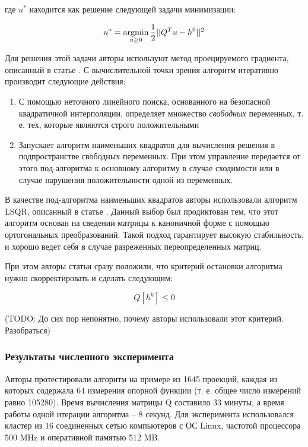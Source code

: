 \documentclass[a4paper, 12pt, titlepage]{article}
\theoremstyle{definition}
\theoremstyle{plain}
\theoremstyle{plain}
\begin{document}
где $u^{*}$ находится как решение следующей задачи минимизации:

\begin{equation}
 u^{*} = \operatornamewithlimits{argmin}_{u \geq 0}
 \frac{1}{2} ||Q^{T} u - h^{0}||^{2}
\end{equation}

Для решения этой задачи авторы используют метод проецируемого градиента,
описанный в статье \cite{journals/laa/BierlaireTT1995}. С вычислительной точки
зрения алгоритм итеративно производит следующие действия:

\begin{enumerate}
 \item С помощью неточного линейного поиска, основанного на безопасной
 квадратичной интерполяции, определяет множество \textit{свободных} переменных,
 т. е. тех, которые являются строго положительными
 \item Запускает алгоритм наименьших квадратов для вычисления решения в
 подпространстве свободных переменных. При этом управление передается от этого
 под-алгоритма к основному алгоритму в случае сходимости или в случае нарушения
 положительности одной из переменных.
\end{enumerate}

В качестве под-алгоритма наименьших квадратов авторы использовали алгоритм
LSQR, описанный в статье \cite{journals/acmtms/PaigeS1982}. Данный выбор был
продиктован тем, что этот алгоритм основан на сведении матрицы к каноничной
форме с помощью ортогональных преобразований. Такой подход гарантирует
высокую стабильность, и хорошо ведет себя в случае разреженных переопределенных
матриц.

При этом авторы статьи сразу положили, что критерий остановки алгоритма нужно
скорректировать и сделать следующим:

\begin{equation}
 Q[h^{k}] \leq 0
\end{equation}

(TODO: До сих пор непонятно, почему авторы использовали этот критерий.
Разобраться)

\subsubsection{Результаты численного эксперимента}

Авторы протестировали алгоритм на примере из 1645 проекций, каждая из которых
содержала 64 измерения опорной функции (т. е. общее число измерений равно
105280). Время вычисления матрицы Q составило 33 минуты, а время работы одной
итерации алгоритма -- 8 секунд. Для эксперимента использовался кластер из 16
соединенных сетью компьютеров с ОС Linux, частотой процессора 500 MHz и
оперативной памятью 512 MB.
\end{document}
